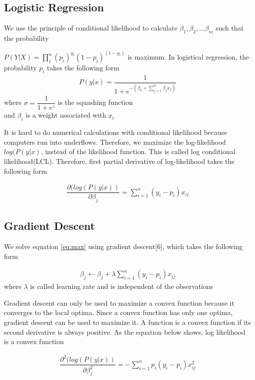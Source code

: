 \documentclass{acm_proc_article-sp}
\begin{document}
\subsection{Logistic Regression}
We use the principle of conditional likelihood\cite{efron1975efficiency} to calculate $\beta_{1},\beta_{2},...\beta_{m}$ such that the probability 

$P(Y|X) = \prod\limits_{1}^n (p_{i})^{y_{i}}(1-p_{i})^{(1-y_{i})}$ is maximum. In logistical regression, the probability $p_{i}$ takes the following form
\begin{align}
P(y|x)=\dfrac{1}{1+e^{-(\beta_{0}+\sum\limits_{j=1}^n \beta_{j}x_{j})}}
\end{align}
where $\sigma=\dfrac{1}{1+e^{z}}$ is the squashing function\\
and $\beta_i$ is a weight associated with $x_i$

It is hard to do numerical calculations with conditional likelihood because computers run into underflows. Therefore, we maximize the log-likelihood $log(P(y|x)$, instead of the likelihood function. This is called log conditional likelihood(LCL). Therefore, first partial derivative of log-likelihood takes the following form

\begin{align}\label{eq:max}
\dfrac{\partial(log(P(y|x))}{\partial\beta_{j}} = \sum\limits_{i=1}^n(y_i-p_i)x_{ij}
\end{align}

\subsection{Gradient Descent}
We solve equation \ref{eq:max} using gradient descent[6], which takes the following form

\begin{align}\label{eq:betaUpdate}
\beta_j \gets \beta_j + \lambda\sum\limits_{i=1}^n(y_i-p_i)x_{ij}
\end{align}
where $\lambda$ is called learning rate and is independent of the observations

Gradient descent can only be used to maximize a convex function because it converges to the local optima. Since a convex function has only one optima, gradient descent can be used to maximize it. A function is a convex function if its second derivative is always positive. As the equation below shows, log likelihood is a convex function

\begin{align}
\dfrac{\partial^2(log(P(y|x))}{\partial\beta_{j}^2} = -\sum\limits_{i=1}^np_i(y_i-p_i)x_{ij}^2
\end{align}
\end{document}
